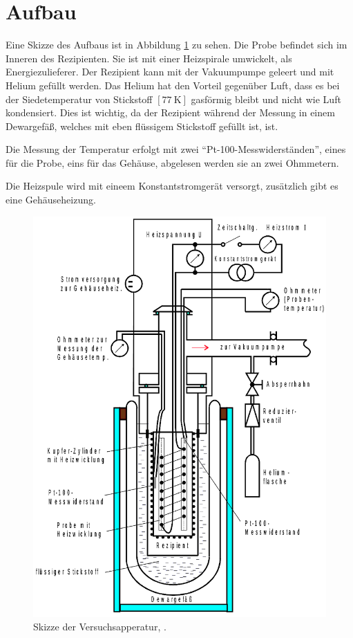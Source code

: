 \section{Aufbau}
\label{sec:Aufbau}
Eine Skizze des Aufbaus ist in Abbildung \ref{fig:aufbau} zu sehen.
Die Probe befindet sich im Inneren des Rezipienten.
Sie ist mit einer Heizspirale umwickelt, als Energiezulieferer.
Der Rezipient kann mit der Vakuumpumpe geleert und mit Helium gefüllt werden.
Das Helium hat den Vorteil gegenüber Luft, dass es bei der Siedetemperatur von
Stickstoff $\left[\SI{77}{\kelvin}\right]$ gasförmig bleibt und nicht wie Luft kondensiert.
Dies ist wichtig, da der Rezipient während der Messung in einem Dewargefäß,
welches mit eben flüssigem Stickstoff gefüllt ist, ist.

Die Messung der Temperatur erfolgt mit zwei \enquote{Pt-100-Messwiderständen},
eines für die Probe, eins für das Gehäuse, abgelesen werden sie an zwei Ohmmetern.

Die Heizspule wird mit eineem Konstantstromgerät versorgt, zusätzlich gibt es eine
Gehäuseheizung.
\begin{figure}
  \centering
  \includegraphics[height=0.6\textheight]{images/aufbau.png}
  \caption{Skizze der Versuchsapperatur, \cite{anleitung}.}
  \label{fig:aufbau}
\end{figure}

